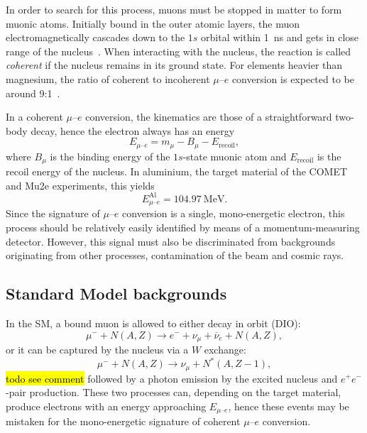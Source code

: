 In order to search for this process, muons must be stopped in matter to form
muonic atoms. Initially bound in the outer atomic layers, the muon
electromagnetically cascades down to the $1s$ orbital within \SI{1}{\ns}
and gets in close range of the nucleus~\cite{Knecht2020}. 
When interacting with the nucleus, the reaction is called \emph{coherent} if the
nucleus remains in its ground state. For elements heavier than magnesium, the
ratio of coherent to incoherent $\mu$--$e$ conversion is expected to be around
9:1~\cite{CHIANG1993526}.

In a coherent $\mu$--$e$ conversion, the kinematics are those of a
straightforward two-body decay, hence the electron always has an energy
\begin{equation*}\label{eq:mu_e_conv_energy}
E_{\mu\text{--}e} = m_\mu - B_\mu - E_\mathrm{recoil},
\end{equation*}
where $B_\mu$ is the binding energy of the $1s$-state muonic atom and
$E_\mathrm{recoil}$ is the recoil energy of the nucleus. In aluminium, the
target material of the COMET and Mu2e experiments, this yields
$$
    E^\mathrm{Al}_{\mu\text{--}e} = \SI{104.97}{\MeV}.
$$
Since the signature of $\mu$--$e$ conversion is a single, mono-energetic
electron, this process should be relatively easily identified by means of a
momentum-measuring detector. However, this signal must also be discriminated
from backgrounds originating from other processes, contamination of the beam and
cosmic rays.

\subsection{Standard Model backgrounds}
In the SM, a bound muon is allowed to either decay in orbit (DIO): 
\begin{equation*}\label{eq:dio}
    \mu^- + N(A, Z) \rightarrow e^- + \nu_\mu + \overline{\nu}_e + N(A, Z),
\end{equation*}
or it can be captured by the nucleus via a $W$ exchange: 
\begin{equation*}\label{eq:capture}
    \mu^- + N(A, Z) \rightarrow \nu_\mu + N^*(A, Z-1),
\end{equation*}
\hl{todo see comment}
followed by a photon emission by the excited nucleus and $e^+e^-$-pair production.
These two processes can, depending on the target material, produce electrons
with an energy approaching $E_{\mu\text{--}e}$, hence these events may
be mistaken for the mono-energetic signature of coherent $\mu$--$e$ conversion.

